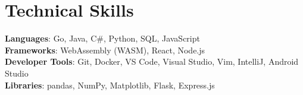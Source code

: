 \documentclass[letterpaper,11pt]{article}
\begin{document}
\section{Technical Skills}
 \begin{itemize}[leftmargin=0.15in, label={}]
    \small{\item{
     \textbf{Languages}{: Go, Java, C#, Python, SQL, JavaScript} \\
     \textbf{Frameworks}{: WebAssembly (WASM), React, Node.js} \\
     \textbf{Developer Tools}{: Git, Docker, VS Code, Visual Studio, Vim, IntelliJ, Android Studio} \\
     \textbf{Libraries}{: pandas, NumPy, Matplotlib, Flask, Express.js}
    }}
 \end{itemize}


\end{document}
